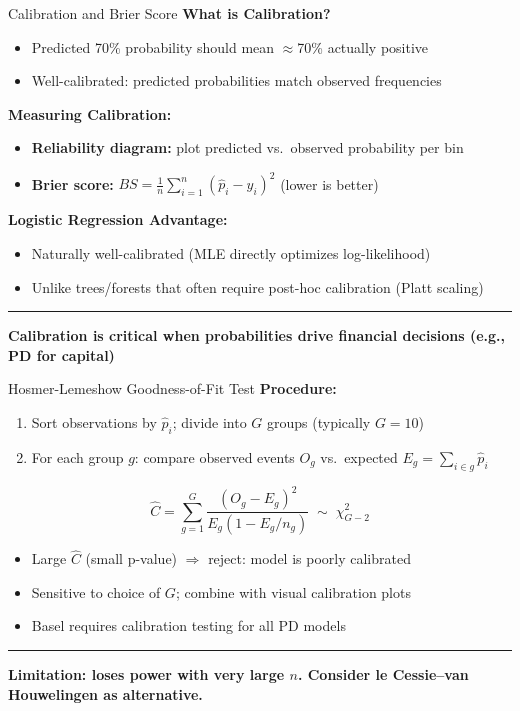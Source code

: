 \documentclass[8pt,aspectratio=169]{beamer}
\newcommand{\bottomnote}[1]{%
\vfill
\vspace{-2mm}
\textcolor{mllavender2}{\rule{\textwidth}{0.4pt}}
\vspace{1mm}
\footnotesize
\textbf{#1}
}
\begin{document}
\begin{frame}[t]{Calibration and Brier Score}
\textbf{What is Calibration?}
\begin{itemize}
\item Predicted 70\% probability should mean $\approx$70\% actually positive
\item Well-calibrated: predicted probabilities match observed frequencies
\end{itemize}
\vspace{0.5em}
\textbf{Measuring Calibration:}
\begin{itemize}
\item \textbf{Reliability diagram:} plot predicted vs.\ observed probability per bin
\item \textbf{Brier score:} $BS = \frac{1}{n}\sum_{i=1}^{n}(\hat{p}_i - y_i)^2$ (lower is better)
\end{itemize}
\vspace{0.3em}
\textbf{Logistic Regression Advantage:}
\begin{itemize}
\item Naturally well-calibrated (MLE directly optimizes log-likelihood)
\item Unlike trees/forests that often require post-hoc calibration (Platt scaling)
\end{itemize}
\bottomnote{Calibration is critical when probabilities drive financial decisions (e.g., PD for capital)}
\end{frame}

\begin{frame}[t]{Hosmer-Lemeshow Goodness-of-Fit Test}
\textbf{Procedure:}
\begin{enumerate}
\item Sort observations by $\hat{p}_i$; divide into $G$ groups (typically $G = 10$)
\item For each group $g$: compare observed events $O_g$ vs.\ expected $E_g = \sum_{i \in g} \hat{p}_i$
\end{enumerate}

\begin{equation}
  \hat{C} = \sum_{g=1}^{G} \frac{(O_g - E_g)^2}{E_g(1 - E_g/n_g)} \;\sim\; \chi^2_{G-2}
\end{equation}

\begin{itemize}
\item Large $\hat{C}$ (small p-value) $\Rightarrow$ reject: model is poorly calibrated
\item Sensitive to choice of $G$; combine with visual calibration plots
\item Basel requires calibration testing for all PD models
\end{itemize}
\bottomnote{Limitation: loses power with very large $n$. Consider le Cessie--van Houwelingen as alternative.}
\end{frame}
\end{document}
